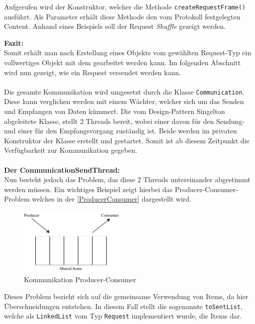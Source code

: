 Aufgerufen wird der Konstruktor, welcher die Methode \lstinline[style=java]{createRequestFrame()} ausführt.
Als Parameter erhält diese Methode den vom Protokoll festgelegten Content.
Anhand eines Beispiels soll der Request \textit{Shuffle} gezeigt werden.

\textbf{Fazit:}\\
Somit erhält man nach Erstellung eines Objekts vom gewählten Request-Typ ein vollwertiges Objekt mit dem gearbeitet werden kann.
Im folgenden Abschnitt wird nun gezeigt, wie ein Request versendet werden kann.\\\\
Die gesamte Kommunikation wird umgesetzt durch die Klasse \lstinline[style=java]{Communication}.
Diese kann verglichen werden mit einem Wächter, welcher sich um das Senden und Empfangen von Daten kümmert.
Die vom Design-Pattern Singelton abgeleitete Klasse, stellt 2 Threads bereit, wobei einer davon für den Sendung- und einer für den Empfangsvorgang zuständig ist.
Beide werden im privaten Konstruktor der Klasse erstellt und gestartet.
Somit ist ab diesem Zeitpunkt die Verfügbarkeit zur Kommunikation gegeben.\\\\
\textbf{Der CommunicationSendThread:}\\
Nun besteht jedoch das Problem, das diese 2 Threads untereinander abgestimmt werden müssen.
Ein wichtiges Beispiel zeigt hierbei das Producer-Consumer-Problem welches in der \autoref{ProducerConsumer} dargestellt wird.
\begin{figure}[H]
\centering
\includegraphics[width=0.45\textwidth]{fig/ainf/ProducerConsumer.pdf}
\caption{Kommunikation Producer-Consumer}
\label{ProducerConsumer}
\end{figure}
Dieses Problem bezieht sich auf die gemeinsame Verwendung von Items, da hier Überschneidungen entstehen.
In diesem Fall stellt die sogenannte \lstinline[style=java]{toSentList}, welche als \lstinline[style=java]{LinkedList} vom Typ \lstinline[style=java]{Request} implementiert wurde, die Items dar.

